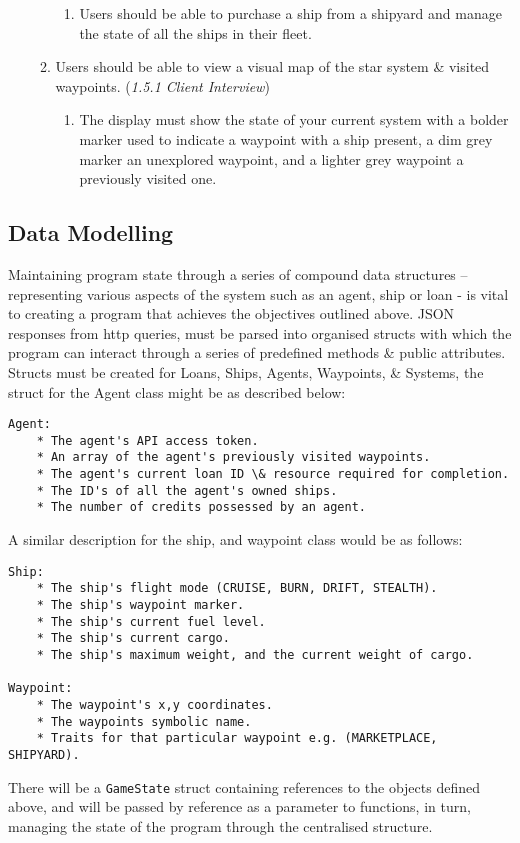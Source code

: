 \begin{enumerate}
\begin{enumerate}
\begin{enumerate}
                \item Users should be able to purchase a ship from a shipyard and manage the state of all the ships in their fleet.
            \end{enumerate}
        \item Users should be able to view a visual map of the star system \& visited waypoints. (\textit{1.5.1 Client Interview})
            \begin{enumerate}
                \item The display must show the state of your current system with a bolder marker  used to indicate a waypoint with a ship present, a dim grey marker an unexplored waypoint, and a lighter grey waypoint a previously visited one.
            \end{enumerate}
    \end{enumerate}
    \end{enumerate}

\subsection{Data Modelling}
Maintaining program state through a series of compound data structures – representing various aspects of the system such as an agent, ship or loan - is vital to creating a program that achieves the objectives outlined above. JSON responses from http queries, must be parsed into organised structs with which the program can interact through a series of predefined methods \& public attributes. Structs must be created for Loans, Ships, Agents, Waypoints, \& Systems, the struct for the Agent class might be as described below:
\begin{lstlisting}
Agent:
    * The agent's API access token.
    * An array of the agent's previously visited waypoints.
    * The agent's current loan ID \& resource required for completion.
    * The ID's of all the agent's owned ships.
    * The number of credits possessed by an agent.
\end{lstlisting}
A similar description for the ship, and waypoint class would be as follows:
\begin{lstlisting}
Ship:
    * The ship's flight mode (CRUISE, BURN, DRIFT, STEALTH).
    * The ship's waypoint marker.
    * The ship's current fuel level.
    * The ship's current cargo.
    * The ship's maximum weight, and the current weight of cargo.

Waypoint:
    * The waypoint's x,y coordinates.
    * The waypoints symbolic name.
    * Traits for that particular waypoint e.g. (MARKETPLACE, SHIPYARD).
\end{lstlisting}
There will be a \texttt{GameState} struct containing references to the objects defined above, and will be passed by reference as a parameter to functions, in turn, managing the state of the program through the centralised structure. 